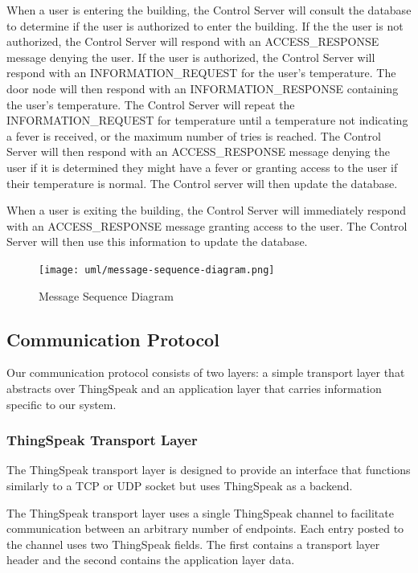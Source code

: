When a user is entering the building, the Control Server will consult the
database to determine if the user is authorized to enter the building.  If the
the user is not authorized, the Control Server will respond with an
ACCESS\_RESPONSE message denying the user.  If the user is authorized, the
Control Server will respond with an INFORMATION\_REQUEST for the user's
temperature.  The door node will then respond with an INFORMATION\_RESPONSE
containing the user's temperature.  The Control Server will repeat the
INFORMATION\_REQUEST for temperature until a temperature not indicating a fever
is received, or the maximum number of tries is reached.  The Control Server
will then respond with an ACCESS\_RESPONSE message denying the user if it is
determined they might have a fever or granting access to the user if their
temperature is normal.  The Control server will then update the database.

When a user is exiting the building, the Control Server will immediately respond
with an ACCESS\_RESPONSE message granting access to the user.  The Control
Server will then use this information to update the database.

\begin{figure}[!htb]
\centering
\texttt{[image: uml/message-sequence-diagram.png]}
\caption{Message Sequence Diagram}
\label{fig:message-sequence-diagram}
\end{figure}

\subsection{Communication Protocol}

Our communication protocol consists of two layers: a simple transport layer that
abstracts over ThingSpeak and an application layer that carries information
specific to our system.

\subsubsection{ThingSpeak Transport Layer}

The ThingSpeak transport layer is designed to provide an interface that
functions similarly to a TCP or UDP socket but uses ThingSpeak as a backend.

The ThingSpeak transport layer uses a single ThingSpeak channel to facilitate
communication between an arbitrary number of endpoints. Each entry posted to the
channel uses two ThingSpeak fields. The first contains a transport layer header
and the second contains the application layer data.


